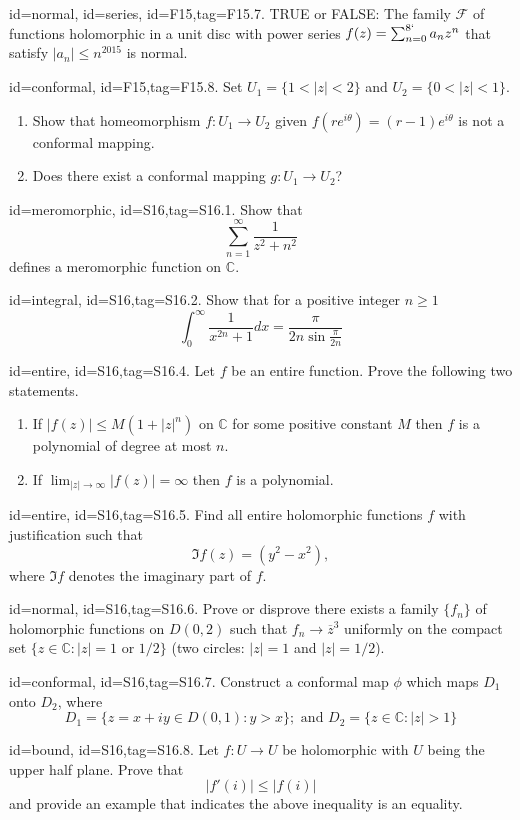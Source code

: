 \documentclass[12pt,letterpaper]{article}
\theoremstyle{plain}
\theoremstyle{definition}
\begin{document}
{\item[id=normal, id=series, id=F15,tag=F15.7.]
TRUE or FALSE: The family $\mathcal{F}$ of functions holomorphic in a unit disc with power series $f(z) = \sum_{n=0}^{8`} a_n z^n$ that satisfy $| a_n | \le n^{2015}$ is normal.

\item[id=conformal, id=F15,tag=F15.8.]
Set $U_1 = \{1 < | z | < 2\}$ and $U_2 = \{0 < | z | < 1\}$.
\begin{enumerate}[label=(\alph*)]\onlyitems
\item Show that homeomorphism $f : U_1 \rightarrow U_2$ given $f(re^{i\theta}) = (r-1)e^{i\theta}$ is not a conformal mapping.
\item Does there exist a conformal mapping $g : U_1 \rightarrow U_2$?
\end{enumerate}


\item[id=meromorphic, id=S16,tag=S16.1.]
Show that
\[
	\sum_{n=1}^{\infty} \frac{1}{z^2 + n^2}
\]
defines a meromorphic function on $\mathbb{C}$.
\item[id=integral, id=S16,tag=S16.2.]
Show that for a positive integer $n \ge 1$
\[
	\int_{0}^{\infty} \frac{1}{x^{2n} + 1} dx = \frac{\pi}{2n \sin \frac{\pi}{2n}}
\]
\item[id=entire, id=S16,tag=S16.4.]
Let $f$ be an entire function. Prove the following two statements.
\begin{enumerate}[label=(\alph*)]\onlyitems
\item If $| f(z) | \le M(1 + | z |^n)$ on $\mathbb{C}$ for some positive constant $M$ then $f$ is a polynomial of degree at most $n$.
\item If $\lim_{| z | \rightarrow \infty} | f(z) | = \infty$ then $f$ is a polynomial.
\end{enumerate}
\item[id=entire, id=S16,tag=S16.5.]
Find all entire holomorphic functions $f$ with justification such that
\[
	\Im f(z) = (y^2 - x^2),
\]
where $\Im f$ denotes the imaginary part of $f$.
\item[id=normal, id=S16,tag=S16.6.]
Prove or disprove there exists a family $\{f_n\}$ of holomorphic functions on $D(0,2)$ such that $f_n \rightarrow \overline{z}^3$ uniformly on the compact set $\{z \in \mathbb{C} \colon | z | = 1 \text{ or } 1/2 \}$ (two circles: $| z | = 1$ and $| z | = 1/2$).
\item[id=conformal, id=S16,tag=S16.7.]
Construct a conformal map $\phi$ which maps $D_1$ onto $D_2$, where
\[
	D_1 = \{z = x + iy \in D(0,1) \colon y > x \}; \text{ and } D_2 = \{z \in \mathbb{C} \colon | z | > 1\}
\]
\item[id=bound, id=S16,tag=S16.8.]
Let $f : U \rightarrow U$ be holomorphic with $U$ being the upper half plane. Prove that
\[
	| f'(i) | \le | f(i) |
\]
and provide an example that indicates the above inequality is an equality.

}
\end{document}
